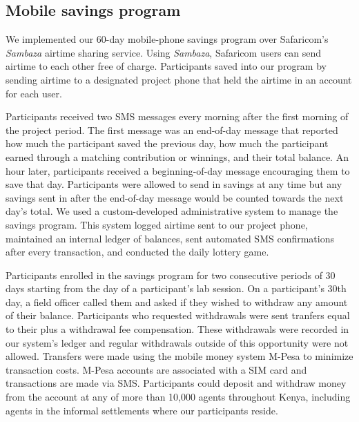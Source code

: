 \documentclass[11pt]{article}
\begin{document}

		

		\clearpage

	\subsection{Mobile savings program}

		We implemented our 60-day mobile-phone savings program over Safaricom's \textit{Sambaza} airtime sharing service. Using \textit{Sambaza}, Safaricom users can send airtime to each other free of charge. Participants saved into our program by sending airtime to a designated project phone that held the airtime in an account for each user.

		Participants received two SMS messages every morning after the first morning of the project period. The first message was an end-of-day message that reported how much the participant saved the previous day, how much the participant earned through a matching contribution or winnings, and their total balance. An hour later, participants received a beginning-of-day message encouraging them to save that day. Participants were allowed to send in savings at any time but any savings sent in after the end-of-day message would be counted towards the next day's total. We used a custom-developed administrative system to manage the savings program. This system logged airtime sent to our project phone, maintained an internal ledger of balances, sent automated SMS confirmations after every transaction, and conducted the daily lottery game.

		Participants enrolled in the savings program for two consecutive periods of 30 days starting from the day of a participant's lab session. On a participant's 30th day, a field officer called them and asked if they wished to withdraw any amount of their balance. Participants who requested withdrawals were sent tranfers equal to their plus a withdrawal fee compensation. These withdrawals were recorded in our system's ledger and regular withdrawals outside of this opportunity were not allowed. Transfers were made using the mobile money system M-Pesa to minimize transaction costs. M-Pesa accounts are associated with a SIM card and transactions are made via SMS. Participants could deposit and withdraw money from the account at any of more than 10,000 agents throughout Kenya, including agents in the informal settlements where our participants reside.
\end{document}
